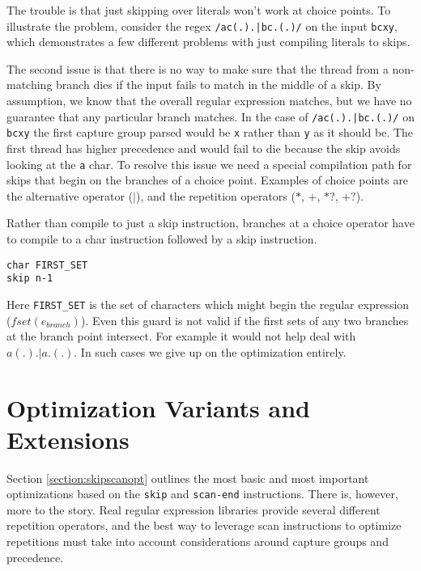 The trouble is that just skipping over literals won't work at choice points.
To illustrate the problem, consider the regex \verb'/ac(.).|bc.(.)/'
on the input \verb'bcxy', which demonstrates a few different problems with
just compiling literals to skips.


The second issue is that there is no way to make sure that the
thread from a non-matching branch dies if the input fails to match in
the middle of a skip. By assumption, we know that the overall regular
expression matches, but we have no guarantee that any particular branch
matches. In the case of \verb'/ac(.).|bc.(.)/' on \verb'bcxy' the
first capture group parsed would be \verb'x' rather than \verb'y' as
it should be. The first thread has higher precedence and would
fail to die because the skip avoids looking at the \verb'a' char.
To resolve this issue we need a special compilation path for skips
that begin on the branches of a choice point. Examples of
choice points are the alternative operator ($\rvert$),
and the repetition operators ($*$, $+$, $*?$, $+?$).

Rather than compile to just a skip instruction, branches
at a choice operator have to compile to a char instruction
followed by a skip instruction.

\begin{verbatim}
char FIRST_SET
skip n-1
\end{verbatim}

Here \verb'FIRST_SET' is the set of characters which might
begin the regular expression ($fset(e_{branch})$).
Even this guard is not valid if the first sets of any two
branches at the branch point intersect. For example it would
not help deal with $a(.).|a.(.)$. In such cases we give up
on the optimization entirely.

\section{Optimization Variants and Extensions}
\label{section:optextend}

Section \ref{section:skipscanopt} outlines the most basic and most
important optimizations based on the \verb'skip' and \verb'scan-end'
instructions. There is, however, more to the story.
Real regular expression libraries provide several different repetition
operators, and the best way to leverage scan instructions to optimize
repetitions must take into account considerations around capture groups and
precedence.

